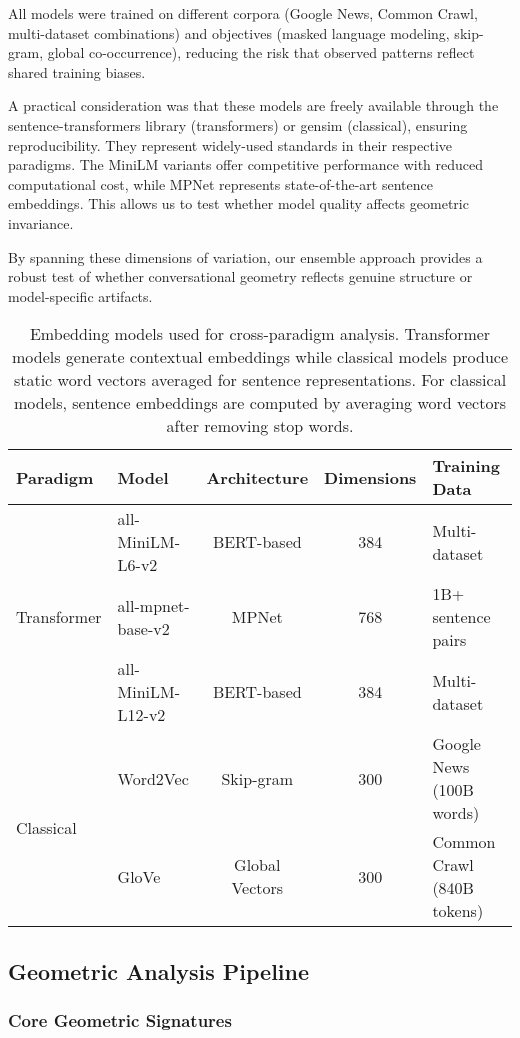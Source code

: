 \documentclass[11pt,letterpaper]{article}
\begin{document}
All models were trained on different corpora (Google News, Common Crawl, multi-dataset combinations) and objectives (masked language modeling, skip-gram, global co-occurrence), reducing the risk that observed patterns reflect shared training biases.

A practical consideration was that these models are freely available through the sentence-transformers library (transformers) or gensim (classical), ensuring reproducibility. They represent widely-used standards in their respective paradigms. The MiniLM variants offer competitive performance with reduced computational cost, while MPNet represents state-of-the-art sentence embeddings. This allows us to test whether model quality affects geometric invariance.

By spanning these dimensions of variation, our ensemble approach provides a robust test of whether conversational geometry reflects genuine structure or model-specific artifacts.

\begin{table}[h]
\centering
\begin{tabular}{llccl}
\toprule
Paradigm & Model & Architecture & Dimensions & Training Data \\
\midrule
\multirow{3}{*}{Transformer} & all-MiniLM-L6-v2 & BERT-based & 384 & Multi-dataset\\
& all-mpnet-base-v2 & MPNet & 768 & 1B+ sentence pairs\\
& all-MiniLM-L12-v2 & BERT-based & 384 & Multi-dataset\\
\midrule
\multirow{2}{*}{Classical} & Word2Vec & Skip-gram & 300 & Google News (100B words)\\
& GloVe & Global Vectors & 300 & Common Crawl (840B tokens)\\
\bottomrule
\end{tabular}
\caption{Embedding models used for cross-paradigm analysis. Transformer models generate contextual embeddings while classical models produce static word vectors averaged for sentence representations. For classical models, sentence embeddings are computed by averaging word vectors after removing stop words.}
\label{tab:embedding_models}
\end{table}

\subsection{Geometric Analysis Pipeline}

\subsubsection{Core Geometric Signatures}
\end{document}
